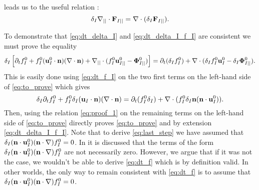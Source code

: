  leads us to the useful relation :
\begin{equation}
    \delta_I \mathbf{\nabla}_{||}\cdot \textbf{F}_{I||}
    = 
    \mathbf{\nabla}\cdot (\delta_I \textbf{F}_{I||}). 
    \label{eq:proof_1}
\end{equation}


To demonstrate that \ref{eq:dt_delta_I} and \ref{eq:dt_delta_I_f_I} are consistent we must prove the equality 
\begin{equation}
    \delta_I
    \left[ \partial_t f_I^0 
    + f_I^0 (\textbf{u}_{I}^0\cdot \textbf{n})  (\mathbf{\nabla}\cdot \textbf{n})
    +\mathbf{\nabla}_{||}\cdot
    (f_I^0 \textbf{u}_{I||}^0
    - \mathbf{\Phi}_{I||}^0 )
    \right]
    =
    \partial_t (\delta_If_I^0) 
    +\mathbf{\nabla}\cdot
    (\delta_If_I^0 \textbf{u}_I^0
        - \delta_I\mathbf{\Phi}_{I||}^0 ).
    \label{eq:to_prove}
\end{equation}
This is easily done  using \ref{eq:dt_f_I} on the two first terms on the left-hand side of \ref{eq:to_prove} which gives
\begin{equation}
    \delta_I \partial_t f_I^0 
    + f_I^0 \delta_I (\textbf{u}_I\cdot\textbf{n})(\mathbf{\nabla}\cdot \textbf{n})
    = 
     \partial_t (f_I^0 \delta_I)
    + \mathbf{\nabla}\cdot(f_I^0  \delta_I \textbf{n}(\textbf{n}\cdot\textbf{u}_I^0)). 
    \label{eq:last_step} 
\end{equation}
Then, using the relation \ref{eq:proof_1} on the remaining terms on the left-hand side of \ref{eq:to_prove} directly proves \ref{eq:to_prove} and by extension \ref{eq:dt_delta_I_f_I}. 
Note that to derive \ref{eq:last_step} we have assumed that $\delta_I (\textbf{n}\cdot\textbf{u}_I^0)(\textbf{n}\cdot\mathbf{\nabla}) f_I^0 = 0$. 
In \citet{orlando2023evolution} it is discussed that the terms of the form $\delta_I (\textbf{n}\cdot\textbf{u}_I^0)(\textbf{n}\cdot\mathbf{\nabla}) f_I^0 $ are not necessarily zero.  
However, we argue that if it was not the case, we wouldn't be able to derive \ref{eq:dt_f} which is by definition valid.
In other worlds, the only way to remain consistent with \ref{eq:dt_f} is to assume that $\delta_I (\textbf{n}\cdot\textbf{u}_I^0)(\textbf{n}\cdot\mathbf{\nabla}) f_I^0 = 0$.

